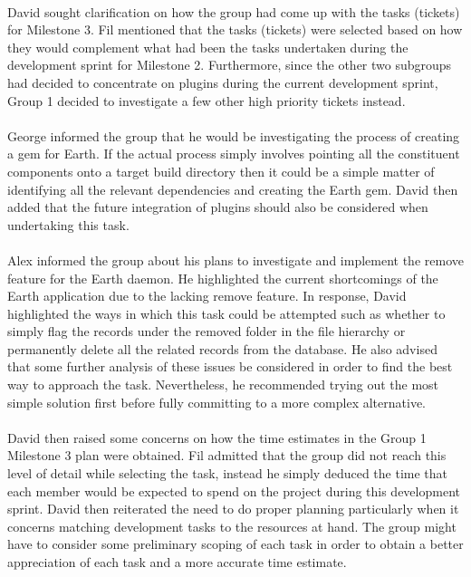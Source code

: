 \documentclass[10pt, a4]{article}
\begin{document}
\paragraph{} David sought clarification on how the group had come up with 
the tasks (tickets) for Milestone 3. Fil mentioned that the tasks (tickets) 
were selected based on how they would complement what had been the tasks
undertaken during the development sprint for Milestone 2. Furthermore, 
since the other two subgroups had decided to concentrate on plugins 
during the current development sprint, Group 1 decided to investigate
a few other high priority tickets instead.

\paragraph{} George informed the group that he would be investigating the 
process of creating a gem for Earth. If the actual process simply involves 
pointing all the constituent components onto a target build directory then 
it could be a simple matter of identifying all the relevant dependencies
and creating the Earth gem. David then added that the future integration 
of plugins should also be considered when undertaking this task.

\paragraph{} Alex informed the group about his plans to investigate and 
implement the remove feature for the Earth daemon. He highlighted the current 
shortcomings of the Earth application due to the lacking remove feature. 
In response, David highlighted the ways in which this task could be 
attempted such as whether to simply flag the records under the removed folder 
in the file hierarchy or permanently delete all the related records 
from the database. He also advised that some further analysis of these 
issues be considered in order to find the best way to approach the task. 
Nevertheless, he recommended trying out the most simple solution first 
before fully committing to a more complex alternative.

\paragraph{} David then raised some concerns on how the time estimates 
in the Group 1 Milestone 3 plan were obtained. Fil admitted that the group 
did not reach this level of detail while selecting the task, instead he simply 
deduced the time that each member would be expected to spend on the project 
during this development sprint. David then reiterated the need to do proper 
planning particularly when it concerns matching development tasks to the
resources at hand. The group might have to consider some preliminary scoping 
of each task in order to obtain a better appreciation of each task and a more
accurate time estimate.
\end{document}
